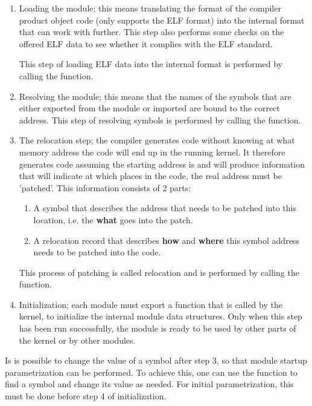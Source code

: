 \begin{enumerate}
\item Loading the module; this means translating the format of the compiler
product object code (\oswald only supports the ELF format) into the internal
format that \oswald can work with further. This step also performs some
checks on the offered ELF data to see whether it complies with the ELF
standard.

This step of loading ELF data into the internal format is performed by calling the 
function.

\item Resolving the module; this means that the names of the symbols that are either exported from
the module or imported are bound to the correct address.
This step of resolving symbols is performed by calling the 
function.

\item The relocation step; the compiler generates code without knowing at
what memory address the code will end up in the running kernel. It therefore
generates code assuming the starting address is  and will
produce information that will indicate at which places in the code, the real
address must be 'patched'. This information consists of 2 parts:
\begin{enumerate}
\item A symbol that describes the address that needs to be patched into this
location, i.e. the \textbf{what} goes into the patch.
\item A relocation record that describes \textbf{how} and \textbf{where} this symbol address needs
to be patched into the code.
\end{enumerate}
This process of patching is called relocation and is performed by calling the 
function.

\item Initialization; each module must export a function that is called by
the kernel, to initialize the internal module data structures. 
Only when this step has been run successfully, the module is ready to be
used by other parts of the kernel or by other modules.
\end{enumerate}

Is is possible to change the value of a symbol after step 3, so
that module startup parametrization can be performed. To achieve this, one can
use the  function to find a symbol and change its
value as needed. For initial parametrization, this must be done before step
4 of initialization.


